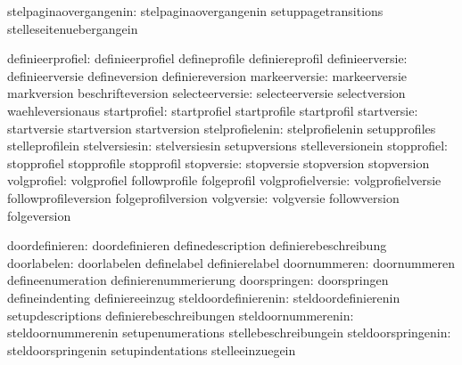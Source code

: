        stelpaginaovergangenin:  stelpaginaovergangenin       setuppagetransitions
                                stelleseitenuebergangein

             definieerprofiel:  definieerprofiel             defineprofile
                                definiereprofil
              definieerversie:  definieerversie              defineversion
                                definiereversion
                markeerversie:  markeerversie                markversion
                                beschrifteversion
              selecteerversie:  selecteerversie              selectversion
                                waehleversionaus
                 startprofiel:  startprofiel                 startprofile
                                startprofil
                  startversie:  startversie                  startversion
                                startversion
              stelprofielenin:  stelprofielenin              setupprofiles
                                stelleprofilein
                stelversiesin:  stelversiesin                setupversions
                                stelleversionein
                  stopprofiel:  stopprofiel                  stopprofile
                                stopprofil
                   stopversie:  stopversie                   stopversion
                                stopversion
                  volgprofiel:  volgprofiel                  followprofile
                                folgeprofil
            volgprofielversie:  volgprofielversie            followprofileversion
                                folgeprofilversion
                   volgversie:  volgversie                   followversion
                                folgeversion

               doordefinieren:  doordefinieren               definedescription
                                definierebeschreibung
                  doorlabelen:  doorlabelen                  definelabel
                                definierelabel
                 doornummeren:  doornummeren                 defineenumeration
                                definierenummerierung
                 doorspringen:  doorspringen                 defineindenting
                                definiereeinzug
         steldoordefinierenin:  steldoordefinierenin         setupdescriptions
                                definierebeschreibungen
           steldoornummerenin:  steldoornummerenin           setupenumerations
                                stellebeschreibungein
           steldoorspringenin:  steldoorspringenin           setupindentations
                                stelleeinzuegein


